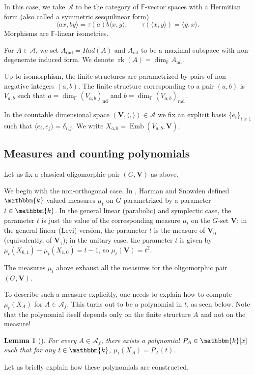 \documentclass[11pt,a4paper]{amsart}
\theoremstyle{plain}%
\newtheorem{lemma}{Lemma}[subsection]
\theoremstyle{definition}
\theoremstyle{remark}
\newcommand{\rk}{{\operatorname{rk}}}
\newcommand{\V}{\mathbf{V}}
\newcommand{\F}{{\mathbb F}}
\newcommand{\kk}{\mathbbm{k}}
\newcommand{\Emb}{\operatorname{Emb}}
\begin{document}
In this case, we take $\mathcal{A}$ to be the category of $\F $-vector spaces with a Hermitian form (also called a symmetric sesquilinear form)
\[
 \langle ax,by\rangle=\tau(a)b\langle x,y\rangle,
 \qquad \tau(\langle x,y\rangle)=\langle y,x\rangle.
\]
Morphisms are $\F $-linear isometries. 

For $A\in \mathcal{A}$, we set $A_{\mathrm{rad}}=Rad(A)$ and $A_{\mathrm{nd}}$ to be a maximal subspace with non-degenerate induced form. We denote $\rk(A)=\dim_{\F } A_{\mathrm{nd}}$.


Up to isomorphism, the finite structures are parametrized by pairs of non-negative integers $(a,b)$. The finite structure corresponding to a pair $(a,b)$ is $V_{a,b}$ such that $a=\dim_{{\F}} (V_{a,b})_{\mathrm{nd}}$ and $b=\dim_{\F } (V_{a,b})_{\mathrm{rad}}$. 

In the countable dimensional space $(\V, \langle, \rangle)\in \mathcal{A}$ we fix an explicit basis $\{e_i\}_{i\geq1}$ such that $\langle e_i,e_j \rangle = \delta_{i,j}$.
 We write $ X_{a,b}=\Emb(V_{a,b},\mathbf V)$.
 

 



 
\subsection{Measures and counting polynomials}\label{sec:counting}
Let us fix a classical oligomorphic pair $(G, \V)$ as above.

We begin with the non-orthogonal case. In \cite[§§6.7, 8.5, 10.4]{HS-classical}, Harman and Snowden defined $\kk$-valued measures $\mu_t$ on $G$ parametrized by a parameter $t\in \kk$. In the general linear (parabolic) and symplectic case, the parameter $t$ is just the value of the corresponding measure $\mu_t$ on the $G$-set $\V$; in the general linear (Levi) version, the parameter $t$ is the measure of $\V_{\bar 0}$ (equivalently, of $\V_{\bar 1}$); in the unitary case, the parameter $t$ is given by $\mu_t(X_{0,1})-\mu_t(X_{1,0})=t-1$, so $\mu_t(\V)=t^2$.

The measures $\mu_t$ above exhaust all the measures for the oligomorphic pair $(G, \V)$.

To describe such a measure explicitly, one needs to explain how to compute $\mu_t(X_A)$ for $A\in \mathcal{A}_f$. This turns out to be a polynomial in $t$, as seen below. Note that the polynomial itself depends only on the finite structure $A$ and not on the measure!
\begin{lemma}[\cite{HS-classical}]\label{lem:measure_is_poly}
    For every $A\in \mathcal{A}_f$, there exists a polynomial $P_A\in \kk[x]$ such that for any $t\in \kk$, $ \mu_t(X_A)=P_A(t)$.
\end{lemma}
Let us briefly explain how these polynomials are constructed.
\end{document}
